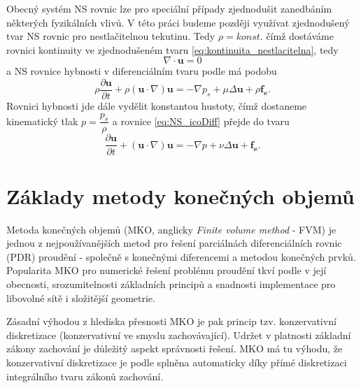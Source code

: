 Obecný systém NS rovnic lze pro speciální případy zjednodušit zanedbáním některých fyzikálních vlivů. 
V této práci budeme později využívat zjednodušený tvar NS rovnic pro nestlačitelnou tekutinu. 
Tedy $\rho=konst.$ čímž dostáváme rovnici kontinuity ve zjednodušeném tvaru \ref{eq:kontinuita_nestlacitelna}, tedy
\begin{equation}\label{eq:NS_icoKontinuita}
\nabla\cdot\mathbf{u} = 0
\end{equation}
a NS rovnice hybnosti v diferenciálním tvaru podle \cite{hirsch2007numerical} má podobu 
\begin{equation}\label{eq:NS_icoDiff}
\rho \dfrac{\partial \mathbf{u}}{\partial t}+ \rho(\mathbf{u}\cdot \nabla)\mathbf{u} = -\nabla p_s + \mu \Delta \mathbf{u} + \rho \mathbf{f_e}.
\end{equation}
Rovnici hybnosti jde dále vydělit konstantou hustoty, čímž dostaneme kinematický tlak $ p = \dfrac{p_s}{\rho} $ a rovnice \ref{eq:NS_icoDiff} přejde do tvaru
\begin{equation}\label{eq:NS_icoPseudotlak}
\dfrac{\partial \mathbf{u}}{\partial t}+ (\mathbf{u}\cdot \nabla)\mathbf{u} = -\nabla p + \nu \Delta \mathbf{u} + \mathbf{f_e}.
\end{equation}



\section{Základy metody konečných objemů}

Metoda konečných objemů (MKO, anglicky \textit{Finite volume method} - FVM) je jednou z nejpoužívanějších metod pro řešení parciálnách diferenciálních rovnic (PDR) proudění - společně s konečnými diferencemi a metodou konečných prvků. 
Popularita MKO pro numerické řešení problému proudění tkví podle \cite{hirsch2007numerical} v její obecnosti, srozumitelnosti základních principů a snadnosti implementace pro libovolné sítě i složitější geometrie.

Zásadní výhodou z hlediska přesnosti MKO je pak princip tzv. konzervativní diskretizace (konzervativní ve smyslu zachovávající). Udržet v platnosti základní zákony zachování je důležitý aspekt správnosti řešení. MKO má tu výhodu, že konzervativní diskretizace je podle \cite{hirsch2007numerical} splněna automaticky díky přímé diskretizaci integrálního tvaru zákonů zachování. 

